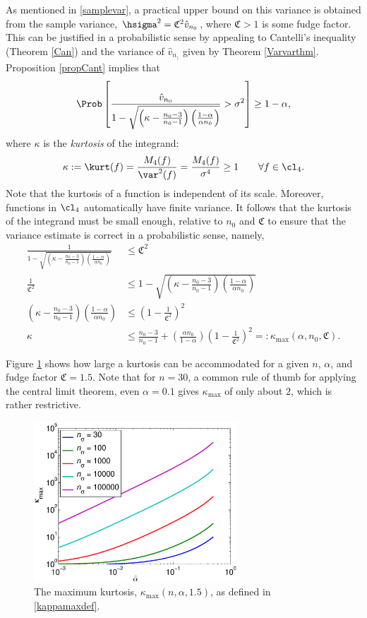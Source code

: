 \documentclass[12pt]{amsart}
\newcommand{\hv}{\hat{v}}
\newcommand{\fudge}{\mathfrak{C}}
\begin{document}
As mentioned in \eqref{samplevar}, a practical upper bound on this variance is obtained from the sample variance, $\hsigma^2 = \fudge^2 \hv_{n_0}$, where $\fudge > 1$ is some fudge factor. This can be justified in a probabilistic sense by appealing to  Cantelli's inequality (Theorem \ref{Can}) and the variance of $\hv_{n_)}$ given by Theorem \ref{Varvarthm}.  Proposition \ref{propCant} implies that
\[
\Prob\left[\frac{\hv_{n_0}}{1 - \sqrt{\left ( \kappa  - \frac{n_0-3}{n_0-1}\right)\left(\frac{1-\alpha}{\alpha n_0}\right)}} > \sigma^2 \right] \ge 1 - \alpha,
\]
where $\kappa$ is the \emph{kurtosis} of the integrand:
\begin{equation} \label{kurtdef}
\kappa:= \kurt(f) = \frac{M_4(f)}{\var^2(f)} = \frac{M_4(f)}{\sigma^4} \ge 1 \qquad \forall f \in \cl_4.
\end{equation}
Note that the kurtosis of a function is independent of its scale.  Moreover, functions in $\cl_4$ automatically have finite variance.  It follows that the kurtosis of the integrand must be small enough, relative to $n_0$ and $\fudge$ to ensure that the variance estimate is correct in a probabilistic sense, namely, 
\begin{align}
\nonumber
\frac{1}{1 - \sqrt{\left ( \kappa  - \frac{n_0-3}{n_0-1}\right)\left(\frac{1-\alpha}{\alpha n_0}\right)}}  &\le \fudge^2\\
\nonumber
\frac{1}{\fudge^2} & \le 1 - \sqrt{\left ( \kappa  - \frac{n_0-3}{n_0-1}\right)\left(\frac{1-\alpha}{ \alpha n_0}\right)} \\
\nonumber
\left ( \kappa  - \frac{n_0-3}{n_0-1}\right)\left(\frac{1-\alpha}{ \alpha n_0}\right)   & \le \left(1 - \frac{1}{\fudge^2}\right)^2\\
\kappa  & \le \frac{n_0-3}{n_0-1} + \left(\frac{ \alpha n_0}{1-\alpha}\right) \left(1 - \frac{1}{\fudge^2}\right)^2 =: \kappa_{\max} (\alpha,n_0,\fudge). \label{kappamaxdef}
\end{align}

Figure \ref{kurtmaxfig} shows how large a kurtosis can be accommodated for a given $n$, $\alpha$, and fudge factor $\fudge=1.5$.  Note that for $n=30$, a common rule of thumb for applying the central limit theorem, even $\alpha=0.1$ gives $\kappa_{\max}$ of only about $2$, which is rather restrictive.

\begin{figure}
\centering
\includegraphics[width=3in]{kurtmaxfig.eps}
\caption{The maximum kurtosis, $\kappa_{\max}(n,\alpha,1.5)$, as defined in \eqref{kappamaxdef}. \label{kurtmaxfig}}
\end{figure}
\end{document}
